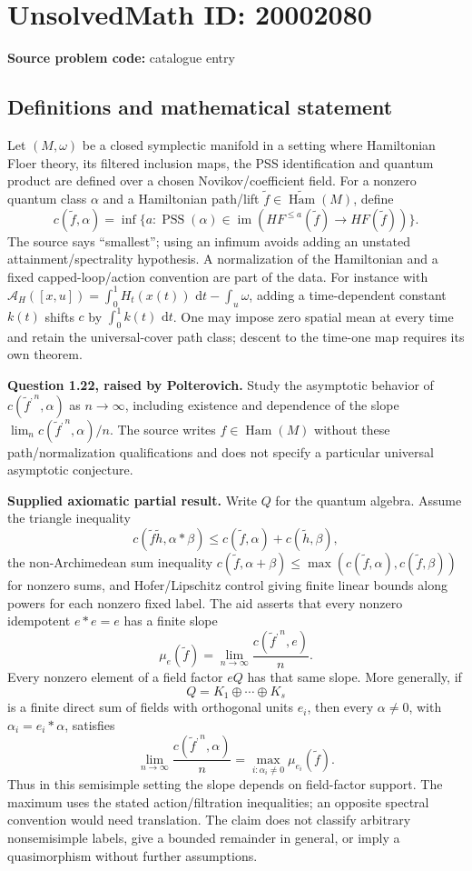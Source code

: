 \documentclass[11pt]{article}
\newcommand{\dd}{\,\mathrm{d}}
\begin{document}
\section*{UnsolvedMath ID: 20002080}
\textbf{Source problem code:} catalogue entry
\subsection{Definitions and mathematical statement}
Let $(M,\omega)$ be a closed symplectic manifold in a setting where Hamiltonian Floer theory, its filtered inclusion maps, the PSS identification and quantum product are defined over a chosen Novikov/coefficient field. For a nonzero quantum class $\alpha$ and a Hamiltonian path/lift $\widetilde f\in\widetilde{\operatorname{Ham}}(M)$, define
\[
 c(\widetilde f,\alpha)=\inf\{a:\operatorname{PSS}(\alpha)
       \in\operatorname{im}(HF^{\le a}(\widetilde f)\to HF(\widetilde f))\}.
\]
The source says ``smallest''; using an infimum avoids adding an unstated attainment/spectrality hypothesis. A normalization of the Hamiltonian and a fixed capped-loop/action convention are part of the data. For instance with $\mathcal A_H([x,u])=\int_0^1H_t(x(t))\,\dd t-\int_u\omega$, adding a time-dependent constant $k(t)$ shifts $c$ by $\int_0^1k(t)\,\dd t$. One may impose zero spatial mean at every time and retain the universal-cover path class; descent to the time-one map requires its own theorem.

\textbf{Question 1.22, raised by Polterovich.} Study the asymptotic behavior of $c(\widetilde f^{,n},\alpha)$ as $n\to\infty$, including existence and dependence of the slope $\lim_n c(\widetilde f^{,n},\alpha)/n$. The source writes $f\in\operatorname{Ham}(M)$ without these path/normalization qualifications and does not specify a particular universal asymptotic conjecture.

\textbf{Supplied axiomatic partial result.} Write $Q$ for the quantum algebra. Assume the triangle inequality
\[
 c(\widetilde f\widetilde h,\alpha*\beta)
       \le c(\widetilde f,\alpha)+c(\widetilde h,\beta),
\]
the non-Archimedean sum inequality $c(\widetilde f,\alpha+\beta)\le\max(c(\widetilde f,\alpha),c(\widetilde f,\beta))$ for nonzero sums, and Hofer/Lipschitz control giving finite linear bounds along powers for each nonzero fixed label. The aid asserts that every nonzero idempotent $e*e=e$ has a finite slope
\[
 \mu_e(\widetilde f)=\lim_{n\to\infty}\frac{c(\widetilde f^{,n},e)}n.
\]
Every nonzero element of a field factor $eQ$ has that same slope. More generally, if
\[
 Q=K_1\oplus\cdots\oplus K_s
\]
is a finite direct sum of fields with orthogonal units $e_i$, then every $\alpha\ne0$, with $\alpha_i=e_i*\alpha$, satisfies
\[
 \lim_{n\to\infty}\frac{c(\widetilde f^{,n},\alpha)}n
   =\max_{i:\alpha_i\ne0}\mu_{e_i}(\widetilde f).
\]
Thus in this semisimple setting the slope depends on field-factor support. The maximum uses the stated action/filtration inequalities; an opposite spectral convention would need translation. The claim does not classify arbitrary nonsemisimple labels, give a bounded remainder in general, or imply a quasimorphism without further assumptions.
\end{document}
